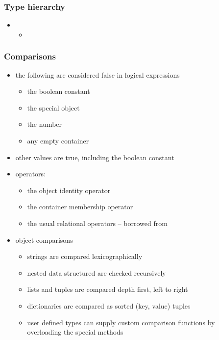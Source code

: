\begin{frame}[fragile]
%
  \frametitle{Type hierarchy}
%
  \begin{itemize}
%
  \item 
    \begin{itemize}
    \item
    \end{itemize}
%
  \end{itemize}
%
\end{frame}

\begin{frame}[fragile]
%
  \frametitle{Comparisons}
%
  \begin{itemize}
%
  \item the following are considered false in logical expressions
    \begin{itemize}
    \item the boolean constant 
    \item the special object 
    \item the number 
    \item any empty container
    \end{itemize}
%
  \item other values are true, including the boolean constant 
%
  \item operators:
    \begin{itemize}
    \item the object identity operator 
    \item the container membership operator 
    \item the usual relational operators -- borrowed from \cc
    \end{itemize}
%
  \item object comparisons
    \begin{itemize}
    \item strings are compared lexicographically
    \item nested data structured are checked recursively
    \item lists and tuples are compared depth first, left to right
    \item dictionaries are compared as sorted (key, value) tuples
    \item user defined types can supply custom comparison functions by overloading the special
      methods
    \end{itemize}
%
  \end{itemize}
%
\end{frame}

